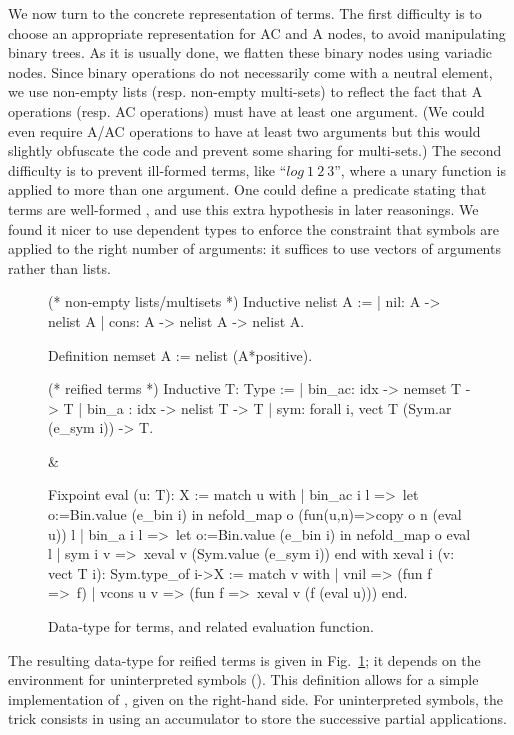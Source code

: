 \documentclass{llncs}
\begin{document}
We now turn to the concrete representation of terms.
The first difficulty is to choose an appropriate representation for AC
and A nodes, to avoid manipulating binary trees.  As it is usually
done, we flatten these binary nodes using variadic nodes. Since binary
operations do not necessarily come with a neutral element, we use
non-empty lists (resp. non-empty multi-sets) to reflect the fact that
A operations (resp. AC operations) must have at least one
argument.
(We could even require A/AC operations to have at least two
arguments but this would slightly obfuscate the code and prevent some
sharing for multi-sets.)
The second difficulty is to prevent ill-formed terms, like
\mbox{``\coqinline$log~1~2~3$''}, where a unary function is applied to
more than one argument. One could define a predicate stating that
terms are well-formed \cite{contejean-04}, and use this extra
hypothesis in later reasonings. We found it nicer to use dependent
types to enforce the constraint that symbols are applied to the right
number of arguments: it suffices to use vectors of arguments rather
than lists.
\begin{figure}[t]
\begin{twolistings}
\begin{coq}
(* non-empty lists/multisets *)
Inductive nelist A := 
| nil: A -> nelist A
| cons: A -> nelist A -> nelist A.

Definition nemset A := 
  nelist (A*positive).

(* reified terms *)
Inductive T: Type := 
| bin_ac: idx -> nemset T -> T
| bin_a : idx -> nelist T -> T
| sym: forall i, vect T (Sym.ar (e_sym i))  -> T.
\end{coq}  
&
\begin{coq}
Fixpoint eval (u: T): X := 
match u with
| bin_ac i l =>~let o:=Bin.value (e_bin i) in
   nefold_map o (fun(u,n)=>copy o n (eval u)) l
| bin_a i l =>~let o:=Bin.value (e_bin i) in
   nefold_map o eval l 
| sym i v =>~xeval v (Sym.value (e_sym i))
end
with xeval i (v: vect T i): Sym.type_of i->X := 
match v with
| vnil => (fun f =>~f)
| vcons u v => (fun f =>~xeval v (f (eval u)))
end.
\end{coq}
\end{twolistings}
\caption{Data-type for terms, and related evaluation function.}
\label{fig:terms}
\end{figure}
The resulting data-type for reified terms is given in
Fig.~\ref{fig:terms}; it depends on the environment for uninterpreted
symbols (). This definition allows for a simple
implementation of , given on the right-hand side. For
uninterpreted symbols, the trick consists in using an accumulator to
store the successive partial applications.
\end{document}
